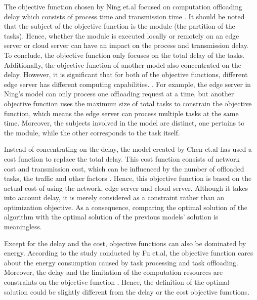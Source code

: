 \documentclass[a4paper,11pt]{article}
\begin{document}
The objective function chosen by Ning et.al focused on computation offloading delay which consists of process time and transmission time \cite{A_Cooperative_Partial_Computation_Offloading_Scheme_for_Mobile_Edge}. It should be noted that the subject of the objective function is the module (the partition of the tasks). Hence, whether the module is executed locally or remotely on an edge server or cloud server can have an impact on the process and transmission delay. To conclude, the objective function only focuses on the total delay of the tasks. Additionally, the objective function of another model also concentrated on the delay. However, it is significant that for both of the objective functions, different edge server has different computing capabilities.  \cite{no_cloud_1_density}. For example, the edge server in Ning's model can only process one offloading request at a time, but another objective function uses the maximum size of total tasks to constrain the objective function, which means the edge server can process multiple tasks at the same time. Moreover, the subjects involved in the model are distinct, one pertains to the module, while the other corresponds to the task itself. \newline

Instead of concentrating on the delay, the model created by Chen et.al has used a cost function to replace the total delay. This cost function consists of network cost and transmission cost, which can be influenced by the number of offloaded tasks, the traffic and other factors \cite{full_offload_2}. Hence, this objective function is based on the actual cost of using the network, edge server and cloud server. Although it takes into account delay, it is merely considered as a constraint rather than an optimization objective. As a consequence, comparing the optimal solution of the algorithm with the optimal solution of the previous models' solution is meaningless.\newline

Except for the delay and the cost, objective functions can also be dominated by energy. According to the study conducted by Fu et.al, the objective function cares about the energy consumption caused by task processing and task offloading. Moreover, the delay and the limitation of the computation resources are constraints on the objective function \cite{objective_energy_2}. Hence, the definition of the optimal solution could be slightly different from the delay or the cost objective functions. \newline
\end{document}
